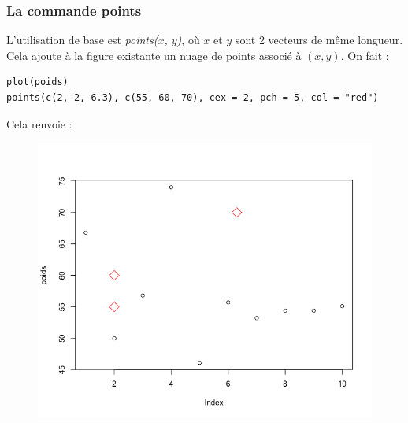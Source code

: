 \subsubsection{La commande points}
L'utilisation de base est \textit{points($x$, $y$)}, où $x$ et $y$ sont 2 vecteurs de même longueur. Cela ajoute à la figure existante un nuage de points associé à $(x, y)$.\newline
On fait :
\begin{lstlisting}[language=html]
plot(poids)
points(c(2, 2, 6.3), c(55, 60, 70), cex = 2, pch = 5, col = "red")
\end{lstlisting}
Cela renvoie :
\begin{figure}[H]\begin{center}\includegraphics[scale=0.4]{ilu/gra54.png}\end{center}\end{figure}

